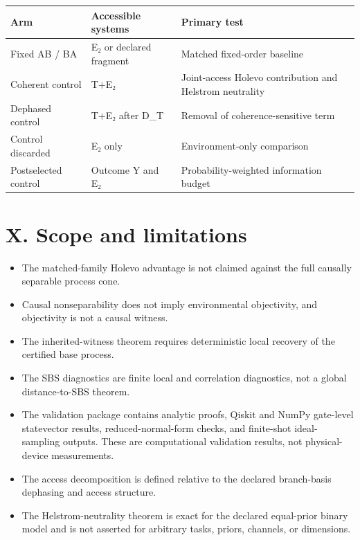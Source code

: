 \documentclass[
]{article}
\begin{document}
\begin{longtable}[]{@{}
  >{\raggedright\arraybackslash}p{}
  >{\raggedright\arraybackslash}p{}
  >{\raggedright\arraybackslash}p{}@{}}
\toprule\noalign{}
\begin{minipage}[b]{\linewidth}\raggedright
\textbf{Arm}
\end{minipage} & \begin{minipage}[b]{\linewidth}\raggedright
\textbf{Accessible systems}
\end{minipage} & \begin{minipage}[b]{\linewidth}\raggedright
\textbf{Primary test}
\end{minipage} \\
\midrule\noalign{}
\endhead
\bottomrule\noalign{}
\endlastfoot
Fixed AB / BA & E₂ or declared fragment & Matched fixed-order
baseline \\
Coherent control & T+E₂ & Joint-access Holevo contribution and Helstrom
neutrality \\
Dephased control & T+E₂ after D\_T & Removal of coherence-sensitive
term \\
Control discarded & E₂ only & Environment-only comparison \\
Postselected control & Outcome Y and E₂ & Probability-weighted
information budget \\
\end{longtable}

\section{X. Scope and limitations}\label{x.-scope-and-limitations}

\begin{itemize}
\item
  The matched-family Holevo advantage is not claimed against the full
  causally separable process cone.
\item
  Causal nonseparability does not imply environmental objectivity, and
  objectivity is not a causal witness.
\item
  The inherited-witness theorem requires deterministic local recovery of
  the certified base process.
\item
  The SBS diagnostics are finite local and correlation diagnostics, not
  a global distance-to-SBS theorem.
\item
  The validation package contains analytic proofs, Qiskit and NumPy
  gate-level statevector results, reduced-normal-form checks, and
  finite-shot ideal-sampling outputs. These are computational validation
  results, not physical-device measurements.
\item
  The access decomposition is defined relative to the declared
  branch-basis dephasing and access structure.
\item
  The Helstrom-neutrality theorem is exact for the declared equal-prior
  binary model and is not asserted for arbitrary tasks, priors,
  channels, or dimensions.
\end{itemize}
\end{document}
